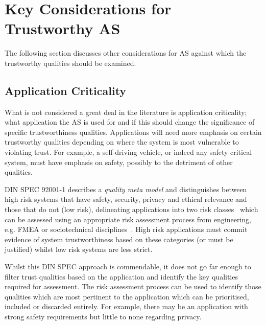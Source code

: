 


\section{Key Considerations for Trustworthy AS} \label{sec:key}

The following section discusses other considerations for AS against which the trustworthy qualities should be examined. 

\subsection{Application Criticality} \label{sec:appcrit}

What is not considered a great deal in the literature is application criticality; what application the AS is used for and if this should change the significance of specific trustworthiness qualities. Applications will need more emphasis on certain trustworthy qualities depending on where the system is most vulnerable to violating trust. 
%
%
For example, a self-driving vehicle, or indeed any safety critical system, must have emphasis on safety, possibly to the detriment of other qualities. 

DIN SPEC 92001-1 describes a \emph{quality meta model} and distinguishes between high risk systems that have safety, security, privacy and ethical relevance and those that do not (low risk), delineating applications into two risk classes~\cite{Englisch2019} which can be assessed using an appropriate risk assessment process from engineering, e.g. FMEA or sociotechnical disciplines~\cite{macrae2021learning}. High risk applications must commit evidence of system trustworthiness based on these categories (or must be justified) whilst low risk systems are less strict. 

Whilst this DIN SPEC approach is commendable, it does not go far enough to filter trust qualities based on the application and identify the key qualities required for assessment. The risk assessment process can be used to identify those qualities which are most pertinent to the application which can be prioritised, included or discarded entirely. For example, there may be an application with strong safety requirements but little to none regarding privacy. 

